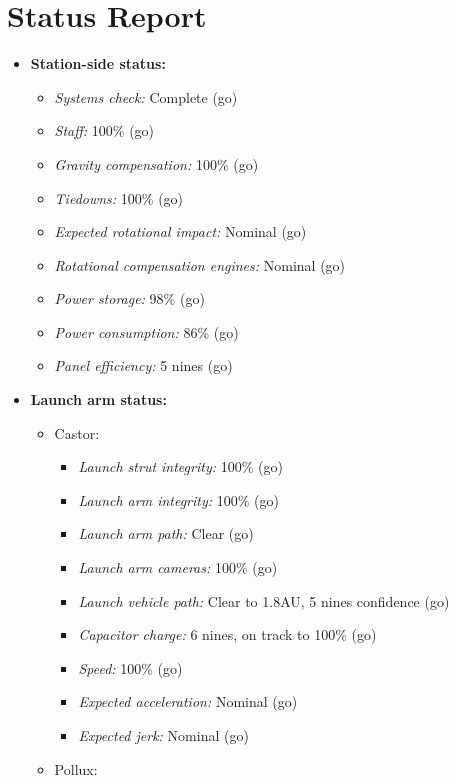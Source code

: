 \hypertarget{status-report-1}{%
\section*{Status Report}\label{status-report-1}}

\begin{itemize}
\tightlist
\item
  \textbf{Station-side status:}

  \begin{itemize}
  \tightlist
  \item
    \emph{Systems check:} Complete (go)
  \item
    \emph{Staff:} 100\% (go)
  \item
    \emph{Gravity compensation:} 100\% (go)
  \item
    \emph{Tiedowns:} 100\% (go)
  \item
    \emph{Expected rotational impact:} Nominal (go)
  \item
    \emph{Rotational compensation engines:} Nominal (go)
  \item
    \emph{Power storage:} 98\% (go)
  \item
    \emph{Power consumption:} 86\% (go)
  \item
    \emph{Panel efficiency:} 5 nines (go)
  \end{itemize}
\item
  \textbf{Launch arm status:}

  \begin{itemize}
  \tightlist
  \item
    Castor:

    \begin{itemize}
    \tightlist
    \item
      \emph{Launch strut integrity:} 100\% (go)
    \item
      \emph{Launch arm integrity:} 100\% (go)
    \item
      \emph{Launch arm path:} Clear (go)
    \item
      \emph{Launch arm cameras:} 100\% (go)
    \item
      \emph{Launch vehicle path:} Clear to 1.8AU, 5 nines confidence (go)
    \item
      \emph{Capacitor charge:} 6 nines, on track to 100\% (go)
    \item
      \emph{Speed:} 100\% (go)
    \item
      \emph{Expected acceleration:} Nominal (go)
    \item
      \emph{Expected jerk:} Nominal (go)
    \end{itemize}
  \item
    Pollux:


\end{itemize}
\end{itemize}
